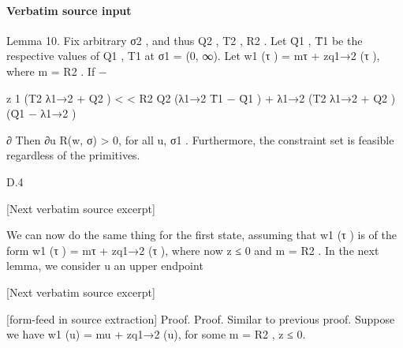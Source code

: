 \documentclass[10pt]{article}
\begin{document}
\paragraph{Verbatim source input}
\begin{ReviewVerbatim}
Lemma 10. Fix arbitrary σ2 , and thus Q2 , T2 , R2 . Let Q̄1 , T̄1 be the respective values of Q1 , T1 at
σ1 = (0, ∞). Let w1 (τ ) = mτ + zq1→2 (τ ), where m = R2 .
If
−

z
1
(T2 λ1→2 + Q2 )
<
<
R2
Q2 (λ1→2 T̄1 − Q̄1 ) + λ1→2 (T2 λ1→2 + Q2 )
(Q̄1 − λ1→2 )

∂
Then ∂u
R(w, σ) > 0, for all u, σ1 . Furthermore, the constraint set is feasible regardless of the
primitives.

D.4

[Next verbatim source excerpt]

We can now do the same thing for the first state, assuming that w1 (τ ) is of the form w1 (τ ) =
mτ + zq1→2 (τ ), where now z ≤ 0 and m = R2 . In the next lemma, we consider u an upper endpoint

[Next verbatim source excerpt]


[form-feed in source extraction]
Proof. Proof. Similar to previous proof. Suppose we have w1 (u) = mu + zq1→2 (u), for some
m = R2 , z ≤ 0.
\end{ReviewVerbatim}
\end{document}
